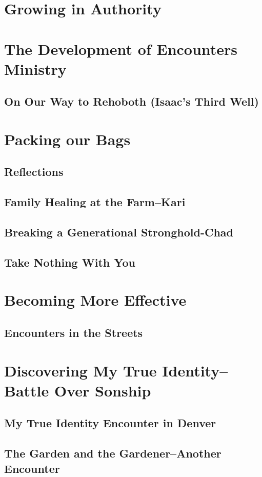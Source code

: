 \documentclass[oneside]{book}
\begin{document}
\chapter{Growing in Authority}
\chapter{The Development of Encounters Ministry}
\section{On Our Way to Rehoboth (Isaac's Third Well)}
\chapter{Packing our Bags}
\section{Reflections}
\section{Family Healing at the Farm--Kari}
\section{Breaking a Generational Stronghold-Chad}
\section{Take Nothing With You}
\chapter{Becoming More Effective}
\section{Encounters in the Streets}
\chapter{Discovering My True Identity--Battle Over Sonship}
\section{My True Identity Encounter in Denver}
\section{The Garden and the Gardener--Another Encounter}
\end{document}
